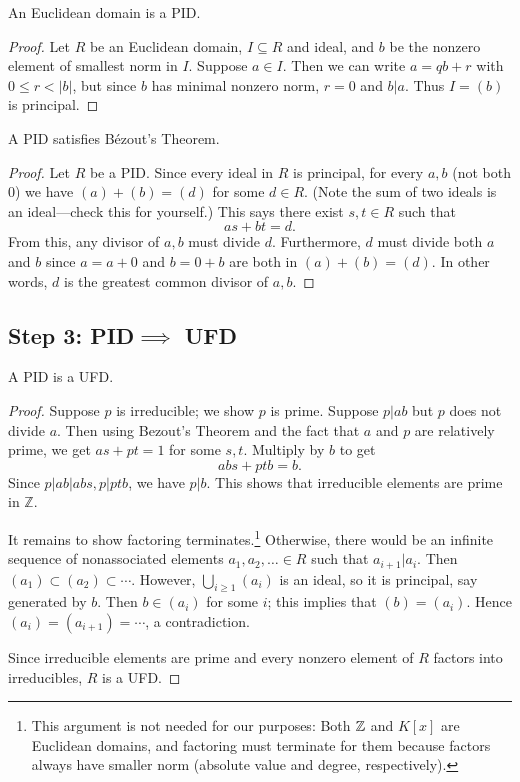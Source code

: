 \begin{thm}
An Euclidean domain is a PID.
\end{thm}
\begin{proof}
Let $R$ be an Euclidean domain, $I\subseteq R$ and ideal, and $b$ be the nonzero element of smallest norm in $I$.
Suppose $ a\in I$. Then we can write $ a = qb + r$ with $ 0\leq r < |b|$, but since $ b$ has minimal nonzero norm, $ r = 0$ and $ b|a$. Thus $ I=(b)$ is principal.
\end{proof}

\begin{lem}\label{pidbez}
A PID satisfies B\'ezout's Theorem.
\end{lem}
\begin{proof}
Let $R$ be a PID. Since every ideal in $R$ is principal, for every $a,b$ (not both 0) we have $(a)+(b)=(d)$
for some $d\in R$. (Note the sum of two ideals is an ideal---check this for yourself.) This says there exist $ s,t\in R$ such that
\[as + bt = d.\]
From this, any divisor of $a,b$ must divide $ d$. Furthermore, $d$ must divide both $a$ and $b$ since $a=a+0$ and $b=0+b$ are both in $(a)+(b)= (d)$. In other words, $d$ is the greatest common divisor of $ a,b$.
\end{proof}
\subsection{Step 3: PID$\implies$ UFD}
\begin{thm}
A PID is a UFD.
\end{thm}
\begin{proof}
Suppose $ p$ is irreducible; we show $ p$ is prime. Suppose $ p|ab$ but $ p$ does not divide $ a$. Then using Bezout's Theorem and the fact that $ a$ and $p$ are relatively prime, we get $ as + pt =1$ for some $ s,t$. Multiply by $ b$ to get
\[ abs + ptb = b.\]
Since $ p|ab|abs, p|ptb$, we have $ p|b$. This shows that irreducible elements are prime in $ \mathbb{Z}$.

It remains to show factoring terminates.\footnote{
This argument is not needed for our purposes: Both $\mathbb{Z}$ and $K[x]$ are Euclidean domains, and factoring must terminate for them because factors always have smaller norm (absolute value and degree, respectively).
}
Otherwise, there would be an infinite sequence of nonassociated elements $a_1,a_2,\ldots \in R$ such that $a_{i+1}|a_i$. Then $(a_1)\subset (a_2)\subset\cdots$. However, $\bigcup_{i\geq 1} (a_i)$ is an ideal, so it is principal, say generated by $b$. Then $b\in (a_i)$ for some $i$; this implies that $(b)=(a_i)$. Hence $(a_i)=(a_{i+1})=\cdots$, a contradiction.

Since irreducible elements are prime and every nonzero element of $R$ factors into irreducibles, $R$ is a UFD.
\end{proof}

